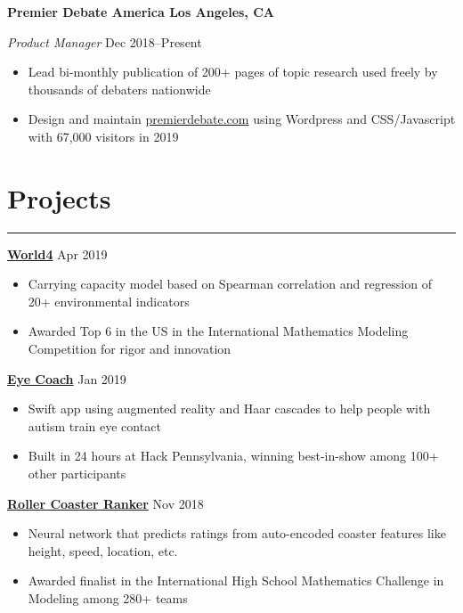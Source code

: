 \documentclass[11pt]{article}
\newcommand{\resumesection}[1]{\vspace{-0.3cm}\section*{\color{highlight}#1}\vspace{-0.3cm}\hrule\vspace{0.3cm}}
\begin{document}
\textbf{Premier Debate America \hfill  Los Angeles, CA} \par
\textit{Product Manager} \hfill Dec 2018--Present \par
\begin{itemize}
	\item Lead bi-monthly publication of 200+ pages of topic research used freely by thousands of debaters nationwide
	\item Design and maintain \href{https://www.premierdebate.com/briefs/}{premierdebate.com} using Wordpress and CSS/Javascript with 67,000 visitors in 2019
\end{itemize}

\resumesection{Projects}

\textbf{\href{https://github.com/gautomdas/IMMC-World4/blob/master/US-9365.pdf}{World4}} \hfill Apr 2019\par
\begin{itemize}
	\item Carrying capacity model based on Spearman correlation and regression of 20+ environmental indicators
	\item Awarded Top 6 in the US in the International Mathematics Modeling Competition for rigor and innovation
\end{itemize}\vspace{0.1cm} \par

\textbf{\href{https://github.com/gautomdas/eye-coach}{Eye Coach}} \hfill Jan 2019 \par

\begin{itemize}
	\item Swift app using augmented reality and Haar cascades to help people with autism train eye contact
	\item Built in 24 hours at Hack Pennsylvania, winning best-in-show among 100+ other participants
\end{itemize}\vspace{0.1cm} \par

\textbf{\href{https://github.com/prayaggordy/HiMCM}{Roller Coaster Ranker}}  \hfill Nov 2018\par

\begin{itemize}
	\item Neural network that predicts ratings from auto-encoded coaster features like height, speed, location, etc.
	\item Awarded finalist in the International High School Mathematics Challenge in Modeling among 280+ teams
\end{itemize}\par
\end{document}
